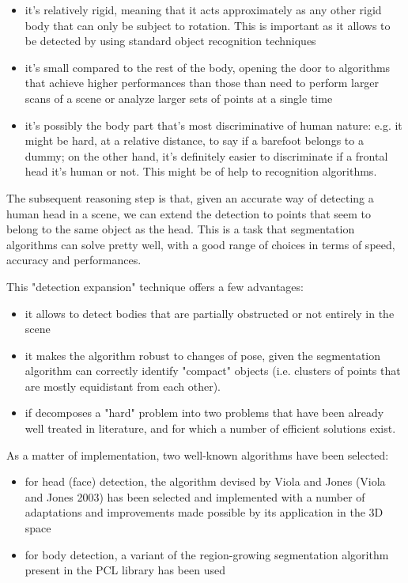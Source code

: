 \documentclass[a4paper,12pt,titlepage]{article}
\begin{document}
\begin{itemize}
  \item it's relatively rigid, meaning that it acts approximately as any other rigid
  body that can only be subject to rotation. This is important as it allows to
  be detected by using standard object recognition techniques
  \item it's small compared to the rest of the body, opening the door to algorithms
  that achieve higher performances than those than need to perform larger scans
  of a scene or analyze larger sets of points at a single time
  \item it's possibly the body part that's most discriminative of human nature: e.g.
  it might be hard, at a relative distance, to say if a barefoot belongs to a
  dummy; on the other hand, it's definitely easier to discriminate if a frontal
  head it's human or not. This might be of help to recognition algorithms.
\end{itemize}

The subsequent reasoning step is that, given an accurate way of detecting a
human head in a scene, we can extend the detection to points that seem to
belong to the same object as the head. This is a task that segmentation
algorithms can solve pretty well, with a good range of choices in terms of
speed, accuracy and performances.

This "detection expansion" technique offers a few advantages:

\begin{itemize}
  \item it allows to detect bodies that are partially obstructed or not entirely in
  the scene
  \item it makes the algorithm robust to changes of pose, given the segmentation
  algorithm can correctly identify "compact" objects (i.e. clusters of points
  that are mostly equidistant from each other).
  \item if decomposes a "hard" problem into two problems that have been already well
  treated in literature, and for which a number of efficient solutions exist.
\end{itemize}

As a matter of implementation, two well-known algorithms have been selected:

\begin{itemize}
  \item for head (face) detection, the algorithm devised by Viola and Jones (Viola and
  Jones 2003) has been selected and implemented with a number of adaptations and
  improvements made possible by its application in the 3D space
  \item for body detection, a variant of the region-growing segmentation algorithm
  present in the PCL library has been used
\end{itemize}
\end{document}
